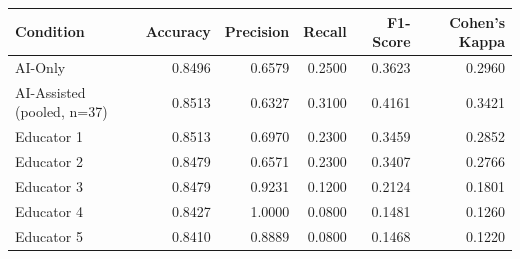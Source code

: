 \begin{tabular}{lrrrrr}
\toprule
Condition & Accuracy & Precision & Recall & F1-Score & Cohen's Kappa \\
\midrule
AI-Only & 0.8496 & 0.6579 & 0.2500 & 0.3623 & 0.2960 \\
AI-Assisted (pooled, n=37) & 0.8513 & 0.6327 & 0.3100 & 0.4161 & 0.3421 \\
Educator 1 & 0.8513 & 0.6970 & 0.2300 & 0.3459 & 0.2852 \\
Educator 2 & 0.8479 & 0.6571 & 0.2300 & 0.3407 & 0.2766 \\
Educator 3 & 0.8479 & 0.9231 & 0.1200 & 0.2124 & 0.1801 \\
Educator 4 & 0.8427 & 1.0000 & 0.0800 & 0.1481 & 0.1260 \\
Educator 5 & 0.8410 & 0.8889 & 0.0800 & 0.1468 & 0.1220 \\
\bottomrule
\end{tabular}
